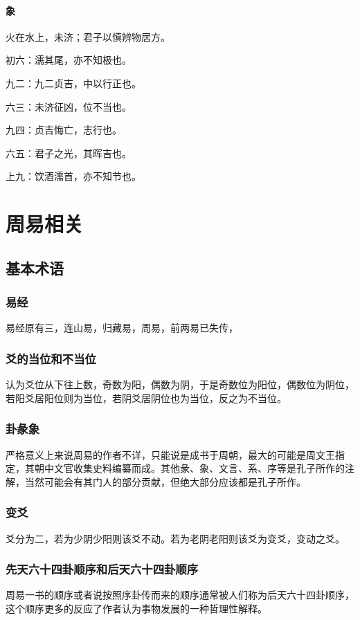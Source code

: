 \documentclass[12pt,oneside]{book}
\begin{document}
\subsection{象}
火在水上，未济；君子以慎辨物居方。

初六：濡其尾，亦不知极也。

九二：九二贞吉，中以行正也。

六三：未济征凶，位不当也。

九四：贞吉悔亡，志行也。

六五：君子之光，其晖吉也。

上九：饮酒濡首，亦不知节也。



\part{周易相关}
\chapter{基本术语}
\section{易经}
易经原有三，连山易，归藏易，周易，前两易已失传，

\section{爻的当位和不当位}
认为爻位从下往上数，奇数为阳，偶数为阴，于是奇数位为阳位，偶数位为阴位，若阳爻居阳位则为当位，若阴爻居阴位也为当位，反之为不当位。

\section{卦彖象}
严格意义上来说周易的作者不详，只能说是成书于周朝，最大的可能是周文王指定，其朝中文官收集史料编纂而成。其他彖、象、文言、系、序等是孔子所作的注解，当然可能会有其门人的部分贡献，但绝大部分应该都是孔子所作。

\section{变爻}
爻分为二，若为少阴少阳则该爻不动。若为老阴老阳则该爻为变爻，变动之爻。

\section{先天六十四卦顺序和后天六十四卦顺序}
周易一书的顺序或者说按照序卦传而来的顺序通常被人们称为后天六十四卦顺序，这个顺序更多的反应了作者认为事物发展的一种哲理性解释。
\end{document}
